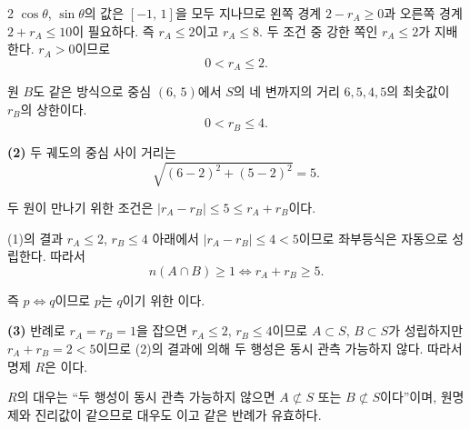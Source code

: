 \documentclass[10pt,fleqn]{article}
\renewcommand{\solpart}[1]{%
  \par\addvspace{10pt}\noindent
  {\sffamily\bfseries\color{black}(#1)}\hspace{3mm}\ignorespaces%
}
\begin{document}
\begin{multicols}{2}
$\cos\theta$, $\sin\theta$의 값은 $[-1,\,1]$을 모두 지나므로 왼쪽 경계 $2-r_{A}\ge 0$과 오른쪽 경계 $2+r_{A}\le 10$이 필요하다. 즉 $r_{A}\le 2$이고 $r_{A}\le 8$. 두 조건 중 강한 쪽인 $r_{A}\le 2$가 지배한다. $r_{A}>0$이므로
\[ 0<r_{A}\le 2. \]

원 $B$도 같은 방식으로 중심 $(6,\,5)$에서 $S$의 네 변까지의 거리 $6, 5, 4, 5$의 최솟값이 $r_{B}$의 상한이다.
\[ 0<r_{B}\le 4. \]

\solpart{2} 두 궤도의 중심 사이 거리는
\[ \sqrt{(6-2)^{2}+(5-2)^{2}}=5. \]

두 원이 만나기 위한 조건은 \mbox{$|r_{A}-r_{B}|\le 5 \le r_{A}+r_{B}$}이다.

(1)의 결과 $r_{A}\le 2$, $r_{B}\le 4$ 아래에서 \mbox{$|r_{A}-r_{B}|\le 4<5$}이므로 좌부등식은 자동으로 성립한다. 따라서
\[ n(A\cap B)\ge 1 \iff r_{A}+r_{B}\ge 5. \]

즉 $p \iff q$이므로 $p$는 $q$이기 위한 이다.

\solpart{3} 반례로 $r_{A}=r_{B}=1$을 잡으면 $r_{A}\le 2$, $r_{B}\le 4$이므로 $A\subset S$, $B\subset S$가 성립하지만 $r_{A}+r_{B}=2<5$이므로 (2)의 결과에 의해 두 행성은 동시 관측 가능하지 않다. 따라서 명제 $R$은 이다.

$R$의 대우는 ``두 행성이 동시 관측 가능하지 않으면 $A\not\subset S$ 또는 $B\not\subset S$이다''이며, 원명제와 진리값이 같으므로 대우도 이고 같은 반례가 유효하다.


\end{multicols}
\end{document}
